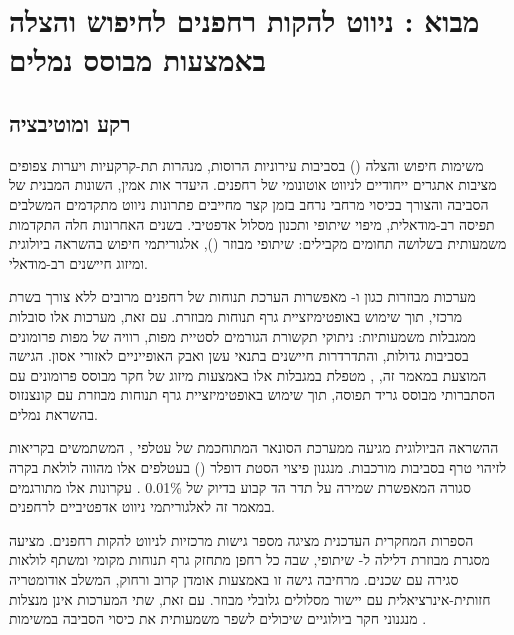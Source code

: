 

\section{מבוא : ניווט להקות רחפנים לחיפוש והצלה באמצעות  מבוסס נמלים}
\label{sec:introduction}

\subsection{רקע ומוטיבציה}
\label{sec:background}

משימות חיפוש והצלה () בסביבות עירוניות הרוסות, מנהרות תת-קרקעיות ויערות צפופים מציבות אתגרים ייחודיים לניווט אוטונומי של רחפנים. היעדר אות  אמין, השונות המבנית של הסביבה והצורך בכיסוי מרחבי נרחב בזמן קצר מחייבים פתרונות ניווט מתקדמים המשלבים תפיסה רב-מודאלית, מיפוי שיתופי ותכנון מסלול אדפטיבי. בשנים האחרונות חלה התקדמות משמעותית בשלושה תחומים מקבילים:  שיתופי מבוזר (), אלגוריתמי חיפוש בהשראה ביולוגית ומיזוג חיישנים רב-מודאלי.

מערכות  מבוזרות כגון  \cite{Lajoie2023SwarmSLAM} ו- \cite{Xu2024D2SLAM} מאפשרות הערכת תנוחות של רחפנים מרובים ללא צורך בשרת מרכזי, תוך שימוש באופטימיזציית גרף תנוחות מבוזרת. עם זאת, מערכות אלו סובלות ממגבלות משמעותיות: ניתוקי תקשורת הגורמים לסטיית מפות, רוויה של מפות פרומונים בסביבות גדולות, והתדרדרות חיישנים בתנאי עשן ואבק האופייניים לאזורי אסון. הגישה המוצעת במאמר זה, , מטפלת במגבלות אלו באמצעות מיזוג של חקר מבוסס פרומונים עם  הסתברותי מבוסס גריד תפוסה, תוך שימוש באופטימיזציית גרף תנוחות מבוזרת עם קונצנזוס בהשראת נמלים.

ההשראה הביולוגית מגיעה ממערכת הסונאר המתוחכמת של עטלפי , המשתמשים בקריאות  לזיהוי טרף בסביבות מורכבות. מנגנון פיצוי הסטת דופלר () בעטלפים אלו מהווה לולאת בקרה סגורה המאפשרת שמירה על תדר הד קבוע בדיוק של 0.01\% \cite{Schnitzler1968DSC}. עקרונות אלו מתורגמים במאמר זה לאלגוריתמי ניווט אדפטיביים לרחפנים.

הספרות המחקרית העדכנית מציגה מספר גישות מרכזיות לניווט להקות רחפנים.  \cite{Lajoie2023SwarmSLAM} מציעה מסגרת מבוזרת דלילה ל- שיתופי, שבה כל רחפן מתחזק גרף תנוחות מקומי ומשתף לולאות סגירה עם שכנים.  \cite{Xu2024D2SLAM} מרחיבה גישה זו באמצעות אומדן קרוב ורחוק, המשלב אודומטריה חזותית-אינרציאלית עם יישור מסלולים גלובלי מבוזר. עם זאת, שתי המערכות אינן מנצלות מנגנוני חקר ביולוגיים שיכולים לשפר משמעותית את כיסוי הסביבה במשימות .

